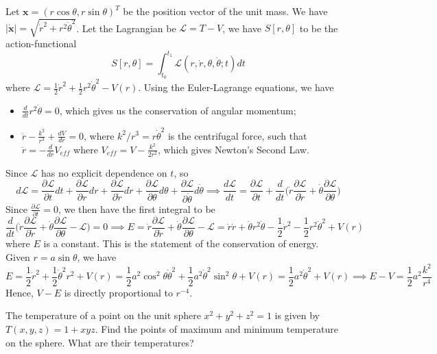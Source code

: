 \documentclass[a4paper]{article}
\begin{document}
\begin{ans}
Let $\mathbf{x}=(r\cos\theta,r\sin\theta)^T$ be the position vector of the unit mass. We have $|\mathbf{\dot{x}}|=\sqrt{\dot{r}^2+r^2\dot{\theta}^2}$. Let the Lagrangian be $\mathcal{L}=T-V$, we have $S[r,\theta]$ to be the action-functional
$$S[r,\theta]=\int_{t_0}^{t_1}\mathcal{L}(r,\dot{r},\theta,\dot{\theta};t)dt$$
where $\mathcal{L}=\frac{1}{2}\dot{r}^2+\frac{1}{2}r^2\dot{\theta}^2-V(r)$. Using the Euler-Lagrange equations, we have
\begin{itemize}
    \item $\frac{d}{dt}r^2\dot{\theta}=0$, which gives us the conservation of angular momentum;
    \item $\ddot{r}-\frac{k^2}{r^3}+\frac{dV}{dr}=0$, where $k^2/r^3=r\dot{\theta}^2$ is the centrifugal force, such that $\ddot{r}=-\frac{d}{dr}V_{eff}$ where $V_{eff}=V-\frac{k^2}{2r^2}$, which gives Newton's Second Law.
\end{itemize}
Since $\mathcal{L}$ has no explicit dependence on $t$, so
$$d\mathcal{L}=\frac{\partial\mathcal{L}}{\partial t}dt+\frac{\partial\mathcal{L}}{\partial r}dr+\frac{\partial\mathcal{L}}{\partial \dot{r}}d\dot{r}+\frac{\partial\mathcal{L}}{\partial\theta}d\theta+\frac{\partial\mathcal{L}}{\partial\dot{\theta}}d\dot{\theta}\implies\frac{d\mathcal{L}}{dt}=\frac{\partial\mathcal{L}}{\partial t}+\frac{d}{dt}\bigg(\dot{r}\frac{\partial\mathcal{L}}{\partial\dot{r}}+\dot{\theta}\frac{\partial\mathcal{L}}{\partial\theta}\bigg)$$
Since $\frac{\partial\mathcal{L}}{\partial t}=0$, we then have the first integral to be
$$\frac{d}{dt}\bigg(\dot{r}\frac{\partial\mathcal{L}}{\partial\dot{r}}+\dot{\theta}\frac{\partial\mathcal{L}}{\partial\theta}-\mathcal{L}\bigg)=0\implies E= \dot{r}\frac{\partial\mathcal{L}}{\partial\dot{r}}+\dot{\theta}\frac{\partial\mathcal{L}}{\partial\theta}-\mathcal{L}=\dot{r}\dot{r}+\dot{\theta}r^2\dot{\theta}-\frac{1}{2}\dot{r}^2-\frac{1}{2}r^2\dot{\theta}^2+V(r)$$
where $E$ is a constant. This is the statement of the conservation of energy.\\[5pt]
Given $r=a\sin\theta$, we have
$$E=\frac{1}{2}\dot{r}^2+\frac{1}{2}\dot{\theta}^2r^2+V(r)=\frac{1}{2}a^2\cos^2\theta\dot{\theta}^2+\frac{1}{2}a^2\dot{\theta}^2\sin^2\theta+V(r)=\frac{1}{2}a^2\dot{\theta}^2+V(r)\implies E-V=\frac{1}{2}a^2\frac{k^2}{r^4}$$
Hence, $V-E$ is directly proportional to $r^{-4}$.
\end{ans}
\begin{qns}
The temperature of a point on the unit sphere $x^2+y^2+z^2=1$ is given by $T(x,y,z)=1+xyz$. Find the points of maximum and minimum temperature on the sphere. What are their temperatures?
\end{qns}
\end{document}
